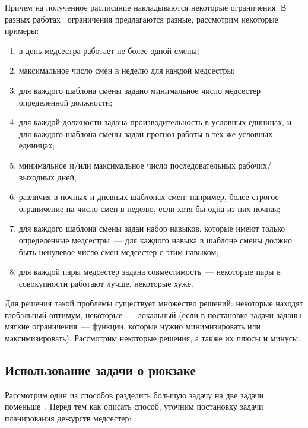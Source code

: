 \documentclass[times,specification,annotation]{itmo-student-thesis}
\begin{document}
Причем на полученное расписание накладываются некоторые ограничения.
В разных работах~\cite{doi:10.1057/palgrave.jors.2600970, BELLANTI200428, indirect-ga-nsp, doi:10.1177/0954411919889560, 934319} ограничения предлагаются разные, рассмотрим некоторые примеры:

\begin{enumerate}
    \item в день медсестра работает не более одной смены;
    \item максимальное число смен в неделю для каждой медсестры;
    \item для каждого шаблона смены задано минимальное число медсестер определенной должности;
    \item для каждой должности задана производительность в условных единицах, и для каждого шаблона смены задан прогноз работы в тех же условных единицах;
    \item минимальное и/или максимальное число последовательных рабочих/выходных дней;
    \item различия в ночных и дневных шаблонах смен: например, более строгое ограничение на число смен в неделю, если хотя бы одна из них ночная;
    \item для каждого шаблона смены задан набор навыков, которые имеют только определенные медсестры~--- для каждого навыка в шаблоне смены должно быть ненулевое число смен медсестер с этим навыком;
    \item для каждой пары медсестер задана совместимость~--- некоторые пары в совокупности работают лучше, некоторые хуже.
\end{enumerate}

Для решения такой проблемы существует множество решений: некоторые находят глобальный оптимум, некоторые~--- локальный (если в постановке задачи заданы мягкие ограничения~--- функции, которые нужно минимизировать или максимизировать).
Рассмотрим некоторые решения, а также их плюсы и минусы.

\subsection{Использование задачи о рюкзаке}

Рассмотрим один из способов разделить большую задачу на две задачи поменьше~\cite{doi:10.1057/palgrave.jors.2600970}.
Перед тем как описать способ, уточним постановку задачи планирования дежурств медсестер:
\end{document}
